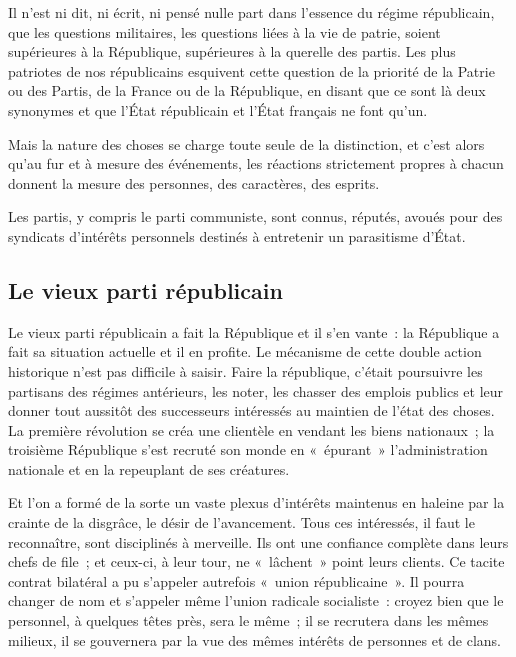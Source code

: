 \documentclass[french,twoside]{book} %
\newcommand{\astermono}{\medskip\centerline{\color{rubric}\large\selectfont{\syms ✻}}\medskip\par}%
\begin{document}
\noindent Il n’est ni dit, ni écrit, ni pensé nulle part dans l’essence du régime républicain, que les questions militaires, les questions liées à la vie de patrie, soient supérieures à la République, supérieures à la querelle des partis. Les plus patriotes de nos républicains esquivent cette question de la priorité de la Patrie ou des Partis, de la France ou de la République, en disant que ce sont là deux synonymes et que l’État républicain et l’État français ne font qu’un.\par
Mais la nature des choses se charge toute seule de la distinction, et c’est alors qu’au fur et à mesure des événements, les réactions strictement propres à chacun donnent la mesure des personnes, des caractères, des esprits.\par

\astermono

\noindent Les partis, y compris le parti communiste, sont connus, réputés, avoués pour des syndicats d’intérêts personnels destinés à entretenir un parasitisme d’État.
\subsection[{Le vieux parti républicain}]{Le vieux parti républicain}
\noindent Le vieux parti républicain a fait la République et il s’en vante : la République a fait sa situation actuelle et il en profite. Le mécanisme de cette double action historique n’est pas difficile à saisir. Faire la république, c’était poursuivre les partisans des régimes antérieurs, les noter, les chasser des emplois publics et leur donner tout aussitôt des successeurs intéressés au maintien de l’état des choses. La première révolution se créa une clientèle en vendant les biens nationaux ; la troisième République s’est recruté son monde en « épurant » l’administration nationale et en la repeuplant de ses créatures.\par
Et l’on a formé de la sorte un vaste plexus d’intérêts maintenus en haleine par la crainte de la disgrâce, le désir de l’avancement. Tous ces intéressés, il faut le reconnaître, sont disciplinés à merveille. Ils ont une confiance complète dans leurs chefs de file ; et ceux-ci, à leur tour, ne « lâchent » point leurs clients. Ce tacite contrat bilatéral a pu s’appeler autrefois « union républicaine ». Il pourra changer de nom et s’appeler même l’union radicale socialiste : croyez bien que le personnel, à quelques têtes près, sera le même ; il se recrutera dans les mêmes milieux, il se gouvernera par la vue des mêmes intérêts de personnes et de clans.\par
\end{document}
